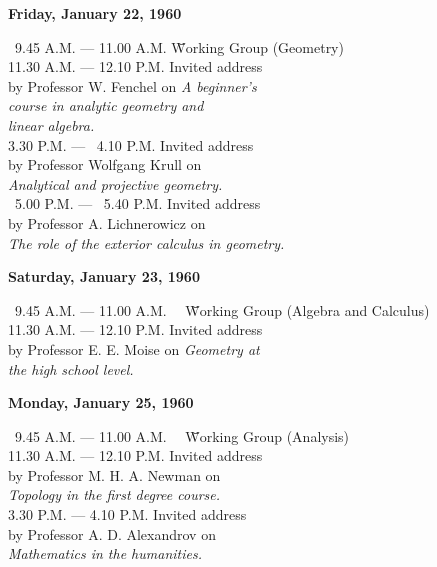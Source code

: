 \begin{center}
\textbf{Friday, January 22, 1960}
\end{center}

\begin{tabbing}
~9.45 A.M. --- 11.00 A.M. \= \= Working Group (Geometry)\\[0.2cm]
11.30 A.M. --- 12.10 P.M. \> \> Invited address\\
\> \> by Professor W. Fenchel on \textit{A beginner's}\\
\> \> \textit{course in analytic geometry and}\\
\>\> \textit{linear algebra.}\\[0.2cm]
3.30 P.M. --- ~4.10 P.M. \> \> Invited address\\
\> \> by Professor Wolfgang Krull on \\
\> \> \textit{Analytical and projective geometry.}\\[0.2cm]
~5.00 P.M. --- ~5.40 P.M. \> \> Invited address\\
\> \> by Professor A. Lichnerowicz on \\
\> \> \textit{The role of the exterior calculus in geometry.}
\end{tabbing}

\begin{center}
\textbf{Saturday, January 23, 1960}
\end{center}

\begin{tabbing}
~9.45 A.M. --- 11.00 A.M. ~~\= \= Working Group (Algebra and
  Calculus)\\[0.2cm]
11.30 A.M. --- 12.10 P.M. \> \> Invited address\\
\> \> by Professor E. E. Moise on \textit{Geometry at}\\
\> \> \textit{the high school level.}
\end{tabbing}

\begin{center}
\textbf{Monday, January 25, 1960}
\end{center}

\begin{tabbing}
~9.45 A.M. --- 11.00 A.M. ~~\= \= Working Group (Analysis)\\[0.2cm]
11.30 A.M. --- 12.10 P.M. \> \> Invited address\\
by Professor M. H. A. Newman on \\
\textit{Topology in the first degree course.}\\[0.2cm]
3.30 P.M. --- 4.10 P.M. \> \> Invited address\\
\> \> by Professor A. D. Alexandrov on\\
\> \> \textit{Mathematics in the humanities.}
\end{tabbing}

